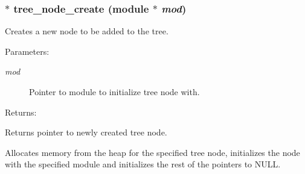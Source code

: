 \subsubsection{$\ast$ tree\_\-node\_\-create ({\bf module} $\ast$ {\em mod})}\label{tree_8h_a0}


Creates a new node to be added to the tree.

\begin{Desc}
\item[Parameters: ]\par
\begin{description}
\item[{\em 
mod}]Pointer to module to initialize tree node with. \end{description}
\end{Desc}
\begin{Desc}
\item[Returns: ]\par
Returns pointer to newly created tree node.\end{Desc}
Allocates memory from the heap for the specified tree node, initializes the node with the specified module and initializes the rest of the pointers to NULL. 